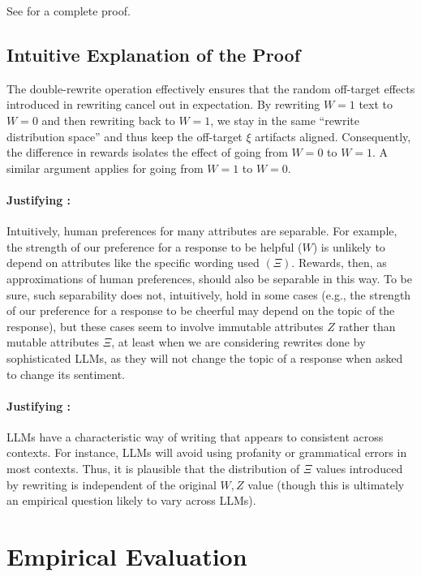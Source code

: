 See  for a complete proof.

\subsection{Intuitive Explanation of the Proof}
The double-rewrite operation effectively ensures that the random off-target effects introduced in rewriting cancel out in expectation. By rewriting $W=1$ text to $W=0$ and then rewriting back to $W=1$, we stay in the same ``rewrite distribution space'' and thus keep the off-target $\xi$ artifacts aligned. Consequently, the difference in rewards isolates the effect of going from $W=0$ to $W=1$. A similar argument applies for going from $W=1$ to $W=0$.

\paragraph{Justifying :} Intuitively, human preferences for many attributes are separable. For example, the strength of our preference for a response to be helpful ($W$) is unlikely to depend on attributes like the specific wording used $(\Xi)$. Rewards, then, as approximations of human preferences, should also be separable in this way. To be sure, such separability does not, intuitively, hold in some cases (e.g., the strength of our preference for a response to be cheerful may depend on the topic of the response), but these cases seem to involve immutable attributes $Z$ rather than mutable attributes $\Xi$, at least when we are considering rewrites done by sophisticated LLMs, as they will not change the topic of a response when asked to change its sentiment.

\paragraph{Justifying :} LLMs have a characteristic way of writing that appears to consistent across contexts. For instance, LLMs will avoid using profanity or grammatical errors in most contexts. Thus, it is plausible that the distribution of $\Xi$ values introduced by rewriting is independent of the original $W, Z$ value (though this is ultimately an empirical question likely to vary across LLMs).

\section{Empirical Evaluation}
\label{sec:experiments}


